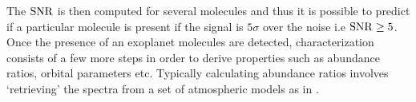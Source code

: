The $\rm{SNR}$ is then computed for several molecules and thus it is possible to predict if a particular molecule is present if the signal is $5\sigma$ over the noise i.e $\rm{SNR}\ge5$.
Once the presence of an exoplanet molecules are detected, characterization consists of a few more steps in order to derive properties such as abundance ratios, orbital parameters etc.
Typically calculating abundance ratios involves `retrieving' the spectra from a set of atmospheric models as in \citep[for e.g deriving the C/H ratios][]{2022Xuan}.



